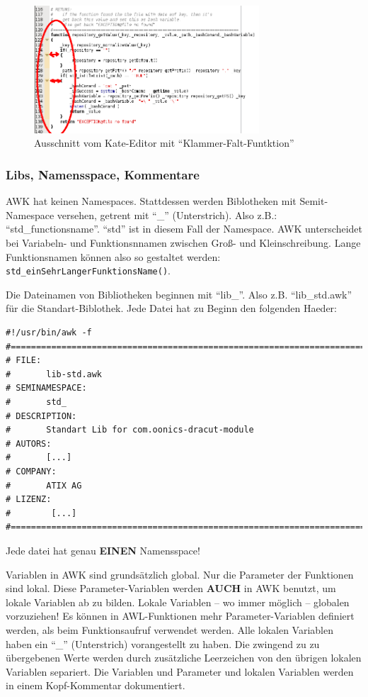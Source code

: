 \documentclass[10pt,a4paper]{article}
\begin{document}
\begin{figure}[H]
 \centering
 \includegraphics[width=0.75\textwidth]{./awk-kate.png}
 \caption[]{Ausschnitt vom Kate-Editor mit "`Klammer-Falt-Funtktion"'}
 \label{pic:kate}
\end{figure}

\subsubsection{Libs, Namensspace, Kommentare}

AWK hat keinen Namespaces. Stattdessen werden Biblotheken mit Semit-Namespace versehen, getrent mit "`\_"' (Unterstrich). Also z.B.: "`std\_functionsname"'. "`std"' ist in diesem Fall der Namespace. AWK unterscheidet bei Variabeln- und Funktionsnnamen zwischen Groß- und Kleinschreibung. Lange Funktionsnamen können also so gestaltet werden: \texttt{std\_einSehrLangerFunktionsName()}.


Die Dateinamen von Bibliotheken beginnen mit "`lib\_"'. Also z.B. "`lib\_std.awk"' für die Standart-Biblothek. Jede Datei hat zu Beginn den folgenden Haeder:

\begin{lstlisting}
#!/usr/bin/awk -f
#==============================================================================
# FILE:
#       lib-std.awk
# SEMINAMESPACE:
#       std_
# DESCRIPTION:
#       Standart Lib for com.oonics-dracut-module
# AUTORS:
#       [...]
# COMPANY:
#       ATIX AG
# LIZENZ:
#        [...]
#==============================================================================
\end{lstlisting}
Jede datei hat genau \textbf{EINEN} Namensspace!


\bigskip 


Variablen in AWK sind grundsätzlich global. Nur die Parameter der Funktionen sind lokal. Diese Parameter-Variablen werden \textbf{AUCH} in AWK benutzt, um lokale Variablen ab zu bilden. Lokale Variablen -- wo immer möglich -- globalen vorzuziehen! Es können in AWL-Funktionen mehr Parameter-Variablen definiert werden, als beim Funktionsaufruf verwendet werden. Alle lokalen Variablen haben ein  "`\_"' (Unterstrich) vorangestellt zu haben. Die zwingend zu zu übergebenen Werte werden durch zusätzliche Leerzeichen von den übrigen lokalen Variablen separiert. Die Variablen und Parameter und lokalen Variablen werden in einem Kopf-Kommentar dokumentiert.
\end{document}
